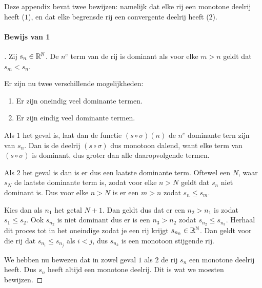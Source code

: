\label{sec:AC}
Deze appendix bevat twee bewijzen: namelijk dat elke rij een monotone deelrij heeft ($1$), en dat elke begrensde rij een convergente deelrij heeft ($2$).

\paragraph{Bewijs van 1}

\begin{proof}[\unskip\nopunct]

Zij $s_{n}\in\mathbb{R}^{\mathbb{N}}$. De $n^{e}$ term van de rij is dominant als voor elke $m>n$ geldt dat $s_{m}<s_{n}$. \bigskip

\noindent Er zijn nu twee verschillende mogelijkheden:

\begin{enumerate}
    \setlength\itemsep{0em}
    \item Er zijn oneindig veel dominante termen.
    \item Er zijn eindig veel dominante termen.
\end{enumerate}

\noindent Als $1$ het geval is, laat dan de functie $(s\circ\sigma)(n)$ de $n^{e}$ dominante tern zijn van $s_{n}$. Dan is de deelrij $(s\circ\sigma)$ dus monotoon dalend, want elke term van $(s\circ\sigma)$ is dominant, dus groter dan alle daaropvolgende termen. \bigskip

\noindent Als $2$ het geval is dan is er dus een laatste dominante term. Oftewel een $N$, waar $s_{N}$ de laatste dominante term is, zodat voor elke $n>N$ geldt dat $s_{n}$ niet dominant is. Dus voor elke $n>N$ is er een $m>n$ zodat $s_{n} \leq s_{m}$. \bigskip

\noindent Kies dan als $n_{1}$ het getal $N+1$. Dan geldt dus dat er een $n_{2}>n_{1}$ is zodat $s_{1} \leq s_{2}$. Ook $s_{n_{2}}$ is niet dominant dus er is een $n_{3}>n_{2}$ zodat $s_{n_{2}} \leq s_{n_{3}}$. Herhaal dit proces tot in het oneindige zodat je een rij krijgt $s_{n_{k}}\in\mathbb{R}^{\mathbb{N}}$. Dan geldt voor die rij dat $s_{n_{i}} \leq s_{n_{j}}$ als $i<j$, dus $s_{n_{k}}$ is een monotoon stijgende rij. \bigskip

\noindent We hebben nu bewezen dat in zowel geval $1$ als $2$ de rij $s_{n}$ een monotone deelrij heeft. Dus $s_{n}$ heeft altijd een monotone deelrij. Dit is wat we moesten bewijzen.

\end{proof}

